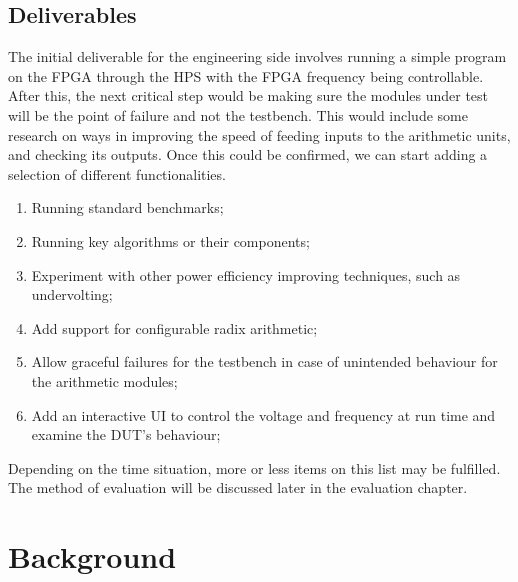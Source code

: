 \documentclass[journal]{IEEEtran}
\begin{document}
\subsection{Deliverables}
The initial deliverable for the engineering side involves running a simple
program on the FPGA through the HPS with the FPGA frequency being controllable.
After this, the next critical step would be making sure the modules under test
will be the point of failure and not the testbench.
This would include some research on ways in improving the speed of feeding
inputs to the arithmetic units, and checking its outputs.
Once this could be confirmed, we can start adding a selection of different functionalities.

\begin{enumerate}
  \item Running standard benchmarks;
  \item Running key algorithms or their components;
  \item Experiment with other power efficiency improving techniques,
        such as undervolting;
  \item Add support for configurable radix arithmetic;
  \item Allow graceful failures for the testbench in case of unintended
        behaviour for the arithmetic modules;
  \item Add an interactive UI to control the voltage and frequency at run time
        and examine the DUT’s behaviour;
\end{enumerate}

Depending on the time situation, more or less items on this list may be fulfilled.
The method of evaluation will be discussed later in the evaluation chapter.

\section{Background}
\end{document}
